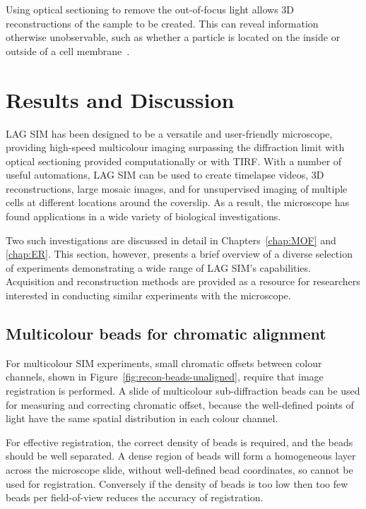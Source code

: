 Using optical sectioning to remove the out-of-focus light allows 3D reconstructions of the sample to be created. 
This can reveal information otherwise unobservable, such as whether a particle is located on the inside or outside of a cell membrane~\cite{teplensky2017temperature}.

\clearpage
\section{Results and Discussion} \label{sec:sim-showcase}
LAG SIM has been designed to be a versatile and user-friendly microscope, providing high-speed multicolour imaging surpassing the diffraction limit with optical sectioning provided computationally or with TIRF.
With a number of useful automations, LAG SIM can be used to create timelapse videos, 3D reconstructions, large mosaic images, and for unsupervised imaging of multiple cells at different locations around the coverslip.
As a result, the microscope has found applications in a wide variety of biological investigations.

Two such investigations are discussed in detail in Chapters~\ref{chap:MOF} and \ref{chap:ER}.
This section, however, presents a brief overview of a diverse selection of experiments demonstrating a wide range of LAG SIM's capabilities.
Acquisition and reconstruction methods are provided as a resource for researchers interested in conducting similar experiments with the microscope.

\subsection{Multicolour beads for chromatic alignment}
For multicolour SIM experiments, small chromatic offsets between colour channels, shown in Figure~\ref{fig:recon-beads-unaligned}, require that image registration is performed.
A slide of multicolour sub-diffraction beads can be used for measuring and correcting chromatic offset, because the well-defined points of light have the same spatial distribution in each colour channel.

For effective registration, the correct density of beads is required, and the beads should be well separated.
A dense region of beads will form a homogeneous layer across the microscope slide, without well-defined bead coordinates, so cannot be used for registration.
Conversely if the density of beads is too low then too few beads per field-of-view reduces the accuracy of registration.

